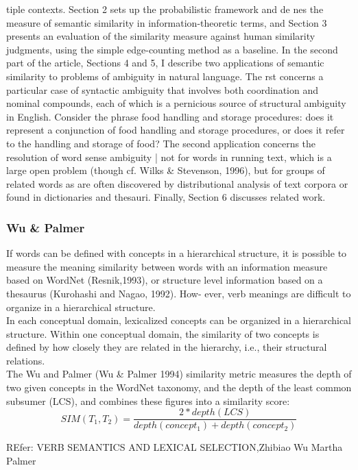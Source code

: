 tiple contexts. Section 2 sets up the probabilistic framework and de nes the measure of semantic similarity in information-theoretic terms, and Section 3 presents an evaluation of the similarity measure against human similarity judgments, using the simple edge-counting method as a baseline.
    In the second part of the article, Sections 4 and 5, I describe two applications of semantic similarity to problems of ambiguity in natural language. The rst concerns a particular case of syntactic ambiguity that involves both coordination and nominal compounds, each of which is a pernicious source of structural ambiguity in English. Consider the phrase food handling and storage procedures: does it represent a conjunction of food handling and storage procedures, or does it refer to the handling and storage of food? The second application concerns the resolution of word sense ambiguity | not for words in running text, which is a large open problem (though cf. Wilks & Stevenson, 1996), but for groups of related words
as are often discovered by distributional analysis of text corpora or found in dictionaries and thesauri. Finally, Section 6 discusses related work.
\subsubsection{Wu \& Palmer}
    If words can be defined with concepts in a hierarchical structure, it is possible to measure the meaning similarity between words with an information measure based on WordNet (Resnik,1993), or structure level information based on a thesaurus (Kurohashi and Nagao, 1992). How-
ever, verb meanings are difficult to organize in a hierarchical structure.\\
In each conceptual domain, lexicalized concepts can be organized in a hierarchical structure. Within one conceptual domain, the similarity of two concepts is defined by how closely they are related in the hierarchy, i.e., their structural relations.\\

The Wu and Palmer (Wu & Palmer 1994) similarity metric measures the depth of two given concepts in the WordNet taxonomy, and the depth of the least common subsumer (LCS), and combines these figures into a similarity score:
\begin{equation}
SIM({T_{1}},{T_{2}}) =\frac{2 * depth(LCS)}{depth(concept_1)+ depth(concept_2)} 
\end{equation}

REfer: VERB SEMANTICS AND LEXICAL  SELECTION,Zhibiao Wu Martha Palmer


